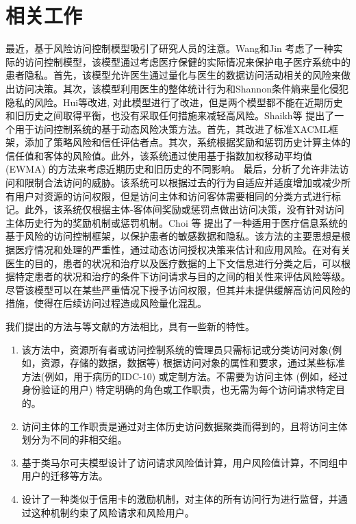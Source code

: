 \section{相关工作}
\label{sec:relate}
最近，基于风险访问控制模型吸引了研究人员的注意\cite{wang2011quantified,shaikh2012dynamic,choi2015framework}。Wang和Jin\cite{wang2011quantified} 考虑了一种实际的访问控制模型，该模型通过考虑医疗保健的实际情况来保护电子医疗系统中的患者隐私。首先，该模型允许医生通过量化与医生的数据访问活动相关的风险来做出访问决策。其次，该模型利用医生的整体统计行为和Shannon条件熵来量化侵犯隐私的风险。Hui等\cite{hui2015risk}改进, 对此模型进行了改进，但是两个模型都不能在近期历史和旧历史之间取得平衡，也没有采取任何措施来减轻高风险。Shaikh等\cite{shaikh2012dynamic} 提出了一个用于访问控制系统的基于动态风险决策方法。首先，其改进了标准XACML框架，添加了策略风险和信任评估者点。其次，系统根据奖励和惩罚历史计算主体的信任值和客体的风险值。此外，该系统通过使用基于指数加权移动平均值 (EWMA) 的方法来考虑近期历史和旧历史的不同影响。 最后，分析了允许非法访问和限制合法访问的威胁。该系统可以根据过去的行为自适应并适度增加或减少所有用户对资源的访问权限，但是访问主体和访问客体需要相同的分类方式进行标记。此外，该系统仅根据主体-客体间奖励或惩罚点做出访问决策，没有针对访问主体历史行为的奖励机制或惩罚机制。Choi 等\cite{choi2015framework}  提出了一种适用于医疗信息系统的基于风险的访问控制框架，以保护患者的敏感数据和隐私。该方法的主要思想是根据医疗情况和处理的严重性，通过动态访问授权决策来估计和应用风险。在对有关医生的目的，患者的状况和治疗以及医疗数据的上下文信息进行分类之后，可以根据特定患者的状况和治疗的条件下访问请求与目的之间的相关性来评估风险等级。尽管该模型可以在某些严重情况下授予访问权限，但其并未提供缓解高访问风险的措施，使得在后续访问过程造成风险量化混乱。

我们提出的方法与\cite{wang2011quantified,shaikh2012dynamic,choi2015framework}等文献的方法相比，具有一些新的特性。

\begin{enumerate}
	\item 该方法中，资源所有者或访问控制系统的管理员只需标记或分类访问对象(例如，资源，存储的数据，数据等) 根据访问对象的属性和要求，通过某些标准方法(例如，用于病历的IDC-10) 或定制方法。不需要为访问主体 (例如，经过身份验证的用户) 特定明确的角色或工作职责，也无需为每个访问请求特定目的。
	\item 访问主体的工作职责是通过对主体历史访问数据聚类而得到的，且将访问主体划分为不同的非相交组。
	\item 基于类马尔可夫模型设计了访问请求风险值计算，用户风险值计算，不同组中用户的迁移等方法。
	\item 设计了一种类似于信用卡的激励机制，对主体的所有访问行为进行监督，并通过这种机制约束了风险请求和风险用户。
\end{enumerate}

